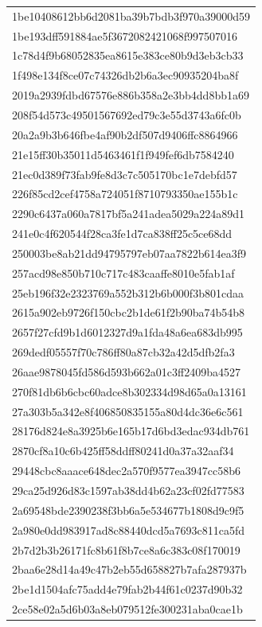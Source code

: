 \begin{tabular}{l}
1be10408612bb6d2081ba39b7bdb3f970a39000d59 \\
1be193dff591884ae5f3672082421068f997507016 \\
1c78d4f9b68052835ea8615e383ce80b9d3eb3cb33 \\
1f498e134f8ce07c74326db2b6a3ec90935204ba8f \\
2019a2939fdbd67576e886b358a2e3bb4dd8bb1a69 \\
208f54d573c49501567692ed79c3e55d3743a6fc0b \\
20a2a9b3b646fbe4af90b2df507d9406ffc8864966 \\
21e15ff30b35011d5463461f1f949fef6db7584240 \\
21ec0d389f73fab9fe8d3c7c505170bc1e7debfd57 \\
226f85cd2cef4758a724051f8710793350ae155b1c \\
2290c6437a060a7817bf5a241adea5029a224a89d1 \\
241e0c4f620544f28ca3fe1d7ca838ff25c5ce68dd \\
250003be8ab21dd94795797eb07aa7822b614ea3f9 \\
257acd98e850b710c717c483caaffe8010e5fab1af \\
25eb196f32e2323769a552b312b6b000f3b801cdaa \\
2615a902eb9726f150cbc2b1de61f2b90ba74b54b8 \\
2657f27cfd9b1d6012327d9a1fda48a6ea683db995 \\
269dedf05557f70c786ff80a87cb32a42d5dfb2fa3 \\
26aae9878045fd586d593b662a01c3ff2409ba4527 \\
270f81db6b6cbc60adce8b302334d98d65a0a13161 \\
27a303b5a342e8f406850835155a80d4dc36e6c561 \\
28176d824e8a3925b6e165b17d6bd3edac934db761 \\
2870cf8a10c6b425ff58ddff80241d0a37a32aaf34 \\
29448cbc8aaace648dec2a570f9577ea3947cc58b6 \\
29ca25d926d83c1597ab38dd4b62a23cf02fd77583 \\
2a69548bde2390238f3bb6a5e534677b1808d9c9f5 \\
2a980e0dd983917ad8c88440dcd5a7693c811ca5fd \\
2b7d2b3b26171fc8b61f8b7ce8a6c383c08f170019 \\
2baa6e28d14a49c47b2eb55d658827b7afa287937b \\
2be1d1504afc75add4e79fab2b44f61c0237d90b32 \\
2ce58e02a5d6b03a8eb079512fe300231aba0cae1b \\

\end{tabular}
